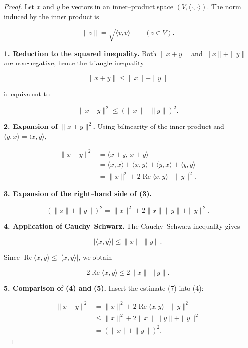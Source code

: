 \begin{proof}
Let \(x\) and \(y\) be vectors in an inner–product space \((V,\langle\cdot,\cdot\rangle)\).
The norm induced by the inner product is  

\[
\|v\|=\sqrt{\langle v,v\rangle}\qquad (v\in V).
\tag{1}
\]

\medskip
\noindent\textbf{1.  Reduction to the squared inequality.}
Both \(\|x+y\|\) and \(\|x\|+\|y\|\) are non‑negative, hence the triangle inequality  

\[
\|x+y\|\le \|x\|+\|y\|
\tag{2}
\]

is equivalent to  

\[
\|x+y\|^{2}\le (\|x\|+\|y\|)^{2}.
\tag{3}
\]

\medskip
\noindent\textbf{2.  Expansion of \(\|x+y\|^{2}\).}
Using bilinearity of the inner product and \(\langle y,x\rangle
=\overline{\langle x,y\rangle}\),

\[
\begin{aligned}
\|x+y\|^{2}
   &=\langle x+y,\,x+y\rangle \\[2pt]
   &=\langle x,x\rangle+\langle x,y\rangle
     +\langle y,x\rangle+\langle y,y\rangle \\[2pt]
   &=\|x\|^{2}+2\operatorname{Re}\langle x,y\rangle+\|y\|^{2}.
\end{aligned}
\tag{4}
\]

\medskip
\noindent\textbf{3.  Expansion of the right–hand side of (3).}

\[
(\|x\|+\|y\|)^{2}= \|x\|^{2}+2\|x\|\|y\|+\|y\|^{2}.
\tag{5}
\]

\medskip
\noindent\textbf{4.  Application of Cauchy–Schwarz.}
The Cauchy–Schwarz inequality gives  

\[
|\langle x,y\rangle|\le \|x\|\,\|y\|.
\tag{6}
\]

Since \(\operatorname{Re}\langle x,y\rangle\le |\langle x,y\rangle|\), we obtain  

\[
2\operatorname{Re}\langle x,y\rangle\le 2\|x\|\,\|y\|.
\tag{7}
\]

\medskip
\noindent\textbf{5.  Comparison of (4) and (5).}
Insert the estimate (7) into (4):

\[
\begin{aligned}
\|x+y\|^{2}
   &=\|x\|^{2}+2\operatorname{Re}\langle x,y\rangle+\|y\|^{2}\\
   &\le \|x\|^{2}+2\|x\|\,\|y\|+\|y\|^{2}\\
   &= (\|x\|+\|y\|)^{2}.
\end{aligned}
\]


\end{proof}
